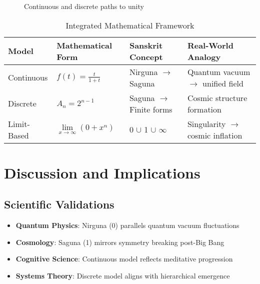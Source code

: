 \documentclass[11pt]{article}
\begin{document}
\begin{figure}[h]
\centering
{}
\caption{Continuous and discrete paths to unity}
\label{fig:combined_graph}
\end{figure}

\begin{table}[h]
\centering
\caption{Integrated Mathematical Framework}
\begin{tabular}{l l l l}
\toprule
Model & Mathematical Form & Sanskrit Concept & Real-World Analogy \\
\midrule
Continuous & \( f(t) = \frac{t}{1+t} \) & Nirguna $\to$ Saguna & Quantum vacuum $\to$ unified field \\
Discrete & \( A_n = 2^{n-1} \) & Saguna $\to$ Finite forms & Cosmic structure formation \\
Limit-Based & \( \lim\limits_{x \to \infty} (0 + x^n) \) & 0 $\cup$ 1 $\cup$ $\infty$ & Singularity $\to$ cosmic inflation \\
\bottomrule
\end{tabular}
\label{tab:framework}
\end{table}

\section{Discussion and Implications}

\subsection{Scientific Validations}
\begin{itemize}
    \item \textbf{Quantum Physics}: Nirguna (0) parallels quantum vacuum fluctuations \citep{despagnat2011}
    \item \textbf{Cosmology}: Saguna (1) mirrors symmetry breaking post-Big Bang \citep{hawking1988}
    \item \textbf{Cognitive Science}: Continuous model reflects meditative progression \citep{kabatzinn2013}
    \item \textbf{Systems Theory}: Discrete model aligns with hierarchical emergence \citep{meadows2008}
\end{itemize}
\end{document}
